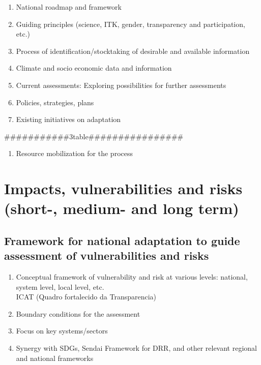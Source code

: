 \documentclass[
]{book}
\providecommand{\tightlist}{%
  \setlength{\itemsep}{0pt}\setlength{\parskip}{0pt}}
\begin{document}
\begin{enumerate}
\def\labelenumi{\alph{enumi}.}
\setcounter{enumi}{2}
\item
  National roadmap and framework
\item
  Guiding principles (science, ITK, gender, transparency and participation, etc.)
\item
  Process of identification/stocktaking of desirable and available information
\item
  Climate and socio economic data and information
\item
  Current assessments: Exploring possibilities for further assessments
\item
  Policies, strategies, plans
\item
  Existing initiatives on adaptation
\end{enumerate}

\#\#\#\#\#\#\#\#\#\#\#3table\#\#\#\#\#\#\#\#\#\#\#\#\#\#\#\#

\begin{enumerate}
\def\labelenumi{\alph{enumi}.}
\setcounter{enumi}{5}
\tightlist
\item
  Resource mobilization for the process
\end{enumerate}

\hypertarget{impacts-vulnerabilities-and-risks-short--medium--and-long-term}{%
\chapter{Impacts, vulnerabilities and risks (short-, medium- and long term)}\label{impacts-vulnerabilities-and-risks-short--medium--and-long-term}}

\hypertarget{framework-for-national-adaptation-to-guide-assessment-of-vulnerabilities-and-risks}{%
\section{Framework for national adaptation to guide assessment of vulnerabilities and risks}\label{framework-for-national-adaptation-to-guide-assessment-of-vulnerabilities-and-risks}}

\begin{enumerate}
\def\labelenumi{\roman{enumi}.}
\tightlist
\item
  Conceptual framework of vulnerability and risk at various levels: national, system level, local level, etc.\\
  ICAT (Quadro fortalecido da Transparencia)
\item
  Boundary conditions for the assessment
\item
  Focus on key systems/sectors
\item
  Synergy with SDGs, Sendai Framework for DRR, and other relevant regional and national frameworks
\end{enumerate}
\end{document}
